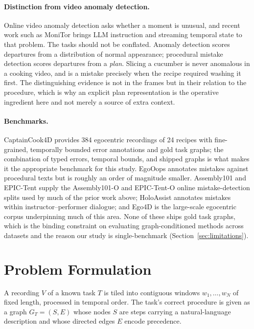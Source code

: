 \documentclass[10pt,twocolumn]{article}
\begin{document}
\paragraph{Distinction from video anomaly detection.}
Online video anomaly detection asks whether a moment is unusual, and recent work
such as MoniTor \citep{monitor2025} brings LLM instruction and streaming
temporal state to that problem. The tasks should not be conflated. Anomaly
detection scores departures from a distribution of normal appearance; procedural
mistake detection scores departures from a \emph{plan}. Slicing a cucumber is
never anomalous in a cooking video, and is a mistake precisely when the recipe
required washing it first. The distinguishing evidence is not in the frames but
in their relation to the procedure, which is why an explicit plan representation
is the operative ingredient here and not merely a source of extra context.

\paragraph{Benchmarks.}
CaptainCook4D \citep{peddi2024captaincook4d} provides 384 egocentric recordings
of 24 recipes with fine-grained, temporally bounded error annotations and gold
task graphs; the combination of typed errors, temporal bounds, and shipped
graphs is what makes it the appropriate benchmark for this study. EgoOops
\citep{haneji2025egooops} annotates mistakes against procedural texts but is
roughly an order of magnitude smaller. Assembly101
\citep{sener2022assembly101} and EPIC-Tent \citep{jang2019epictent} supply the
Assembly101-O and EPIC-Tent-O online mistake-detection splits used by much of
the prior work above; HoloAssist \citep{wang2023holoassist} annotates mistakes
within instructor--performer dialogue; and Ego4D
\citep{grauman2022ego4d} is the large-scale egocentric corpus underpinning much
of this area. None of these ships gold task graphs, which is the binding
constraint on evaluating graph-conditioned methods across datasets and the
reason our study is single-benchmark (Section~\ref{sec:limitations}).

\section{Problem Formulation}
\label{sec:problem}

A recording $V$ of a known task $T$ is tiled into contiguous windows
$w_1,\dots,w_N$ of fixed length, processed in temporal order. The task's correct
procedure is given as a graph $G_T=(S,E)$ whose nodes $S$ are steps carrying a
natural-language description and whose directed edges $E$ encode precedence.
\end{document}
